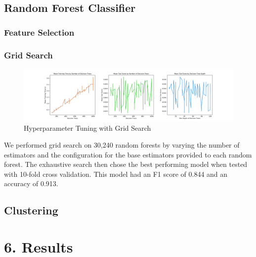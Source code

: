 \documentclass[10pt]{article}
\begin{document}
\subsection*{Random Forest Classifier}

\subsubsection*{Feature Selection}

\subsubsection*{Grid Search}

\begin{figure}[H]
\caption{Hyperparameter Tuning with Grid Search }
\centering
\includegraphics[scale=0.35]{gridsearch.png}
\end{figure}

We performed grid search on 30,240 random forests by varying the number of estimators and the configuration for the base estimators provided to each random forest. The exhaustive search then chose the best performing model when tested with 10-fold cross validation. This model had an F1 score of 0.844 and an accuracy of 0.913. 

\subsection*{Clustering}

\section*{6. Results}
\end{document}
